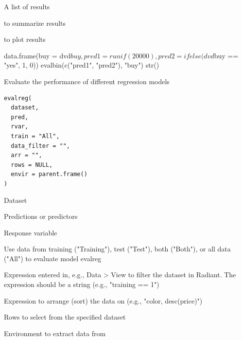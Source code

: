 \documentclass[a4paper]{book}
\begin{document}
%
\begin{Value}
A list of results
\end{Value}
%
\begin{SeeAlso}
 to summarize results

 to plot results
\end{SeeAlso}
%
\begin{Examples}
\begin{ExampleCode}
data.frame(buy = dvd$buy, pred1 = runif(20000), pred2 = ifelse(dvd$buy == "yes", 1, 0)) %
  evalbin(c("pred1", "pred2"), "buy") %
  str()
\end{ExampleCode}
\end{Examples}
%
\begin{Description}
Evaluate the performance of different regression models
\end{Description}
%
\begin{Usage}
\begin{verbatim}
evalreg(
  dataset,
  pred,
  rvar,
  train = "All",
  data_filter = "",
  arr = "",
  rows = NULL,
  envir = parent.frame()
)
\end{verbatim}
\end{Usage}
%
\begin{Arguments}
\begin{ldescription}
\item[\code{dataset}] Dataset

\item[\code{pred}] Predictions or predictors

\item[\code{rvar}] Response variable

\item[\code{train}] Use data from training ("Training"), test ("Test"), both ("Both"), or all data ("All") to evaluate model evalreg

\item[\code{data\_filter}] Expression entered in, e.g., Data > View to filter the dataset in Radiant. The expression should be a string (e.g., "training == 1")

\item[\code{arr}] Expression to arrange (sort) the data on (e.g., "color, desc(price)")

\item[\code{rows}] Rows to select from the specified dataset

\item[\code{envir}] Environment to extract data from
\end{ldescription}
\end{Arguments}
\end{document}
